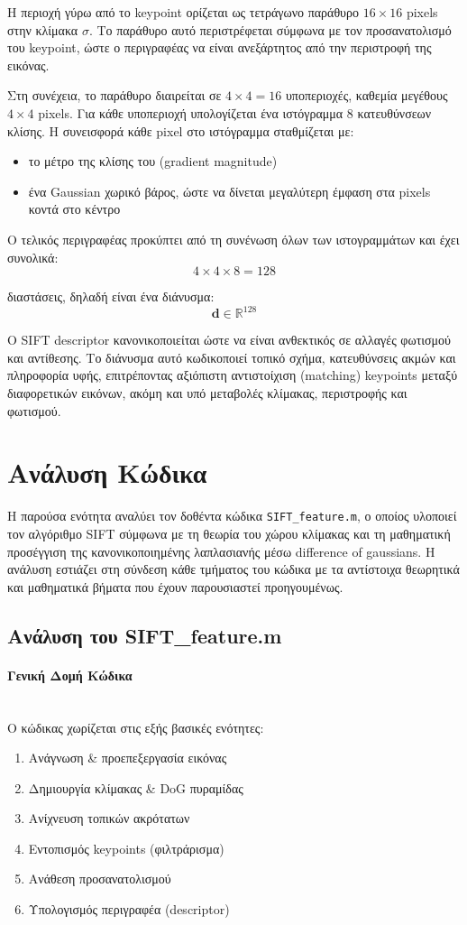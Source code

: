 \documentclass[12pt]{article}
\begin{document}
Η περιοχή γύρω από το keypoint ορίζεται ως τετράγωνο παράθυρο $16 \times 16$ pixels στην κλίμακα $\sigma$. Το παράθυρο αυτό περιστρέφεται σύμφωνα με τον προσανατολισμό του keypoint, ώστε ο περιγραφέας να είναι ανεξάρτητος από την περιστροφή της εικόνας.

Στη συνέχεια, το παράθυρο διαιρείται σε $4 \times 4 = 16$ υποπεριοχές, καθεμία μεγέθους $4 \times 4$ pixels. Για κάθε υποπεριοχή υπολογίζεται ένα ιστόγραμμα 8 κατευθύνσεων κλίσης. Η συνεισφορά κάθε pixel στο ιστόγραμμα σταθμίζεται με:
\begin{itemize}
  \item το μέτρο της κλίσης του (gradient magnitude)
  \item ένα Gaussian χωρικό βάρος, ώστε να δίνεται μεγαλύτερη έμφαση στα pixels κοντά στο κέντρο
\end{itemize}

Ο τελικός περιγραφέας προκύπτει από τη συνένωση όλων των ιστογραμμάτων και έχει συνολικά:
\[
4 \times 4 \times 8 = 128
\]

διαστάσεις, δηλαδή είναι ένα διάνυσμα:
\[
\mathbf{d} \in \mathbb{R}^{128}
\]

Ο SIFT descriptor κανονικοποιείται ώστε να είναι ανθεκτικός σε αλλαγές φωτισμού και αντίθεσης. Το διάνυσμα αυτό κωδικοποιεί τοπικό σχήμα, κατευθύνσεις ακμών και πληροφορία υφής, επιτρέποντας αξιόπιστη αντιστοίχιση (matching)
keypoints μεταξύ διαφορετικών εικόνων, ακόμη και υπό μεταβολές κλίμακας, περιστροφής και φωτισμού.


\section{Ανάλυση Κώδικα}
Η παρούσα ενότητα αναλύει τον δοθέντα κώδικα \texttt{SIFT\_feature.m}, ο οποίος υλοποιεί τον αλγόριθμο SIFT σύμφωνα με τη θεωρία του χώρου κλίμακας 
και τη μαθηματική προσέγγιση της κανονικοποιημένης λαπλασιανής μέσω difference of gaussians. Η ανάλυση εστιάζει στη σύνδεση κάθε τμήματος του κώδικα 
με τα αντίστοιχα θεωρητικά και μαθηματικά βήματα που έχουν παρουσιαστεί προηγουμένως.


\subsection{Ανάλυση του SIFT\_feature.m}
\paragraph{Γενική Δομή Κώδικα}
\mbox{}\\
Ο κώδικας χωρίζεται στις εξής βασικές ενότητες:
\begin{enumerate}
  \item Ανάγνωση \& προεπεξεργασία εικόνας
  \item Δημιουργία κλίμακας \& DoG πυραμίδας
  \item Ανίχνευση τοπικών ακρότατων
  \item Εντοπισμός keypoints (φιλτράρισμα)
  \item Ανάθεση προσανατολισμού
  \item Υπολογισμός περιγραφέα (descriptor)
\end{enumerate}
\end{document}
